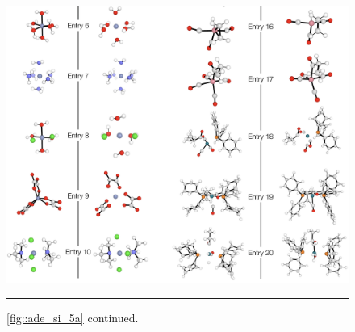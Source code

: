 \documentclass[../../main.tex]{subfiles}
\begin{document}
\begin{figure}[h!]
	\vspace{0.4cm}
	\centering
	\includegraphics[width=\textwidth]{5/autode/figs/figS5b}
	\vspace{0.4cm}
	\hrule
	\caption{\figurename{ }\ref{fig::ade_si_5a} continued.}
	\label{fig::ade_si_5b}
\end{figure}
\end{document}

